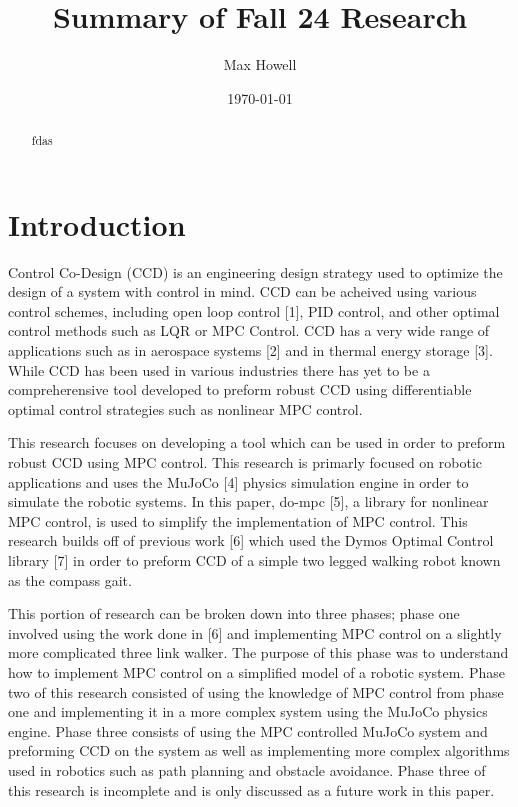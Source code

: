 \documentclass{./springer/svjour3}
\title{Summary of Fall 24 Research}
\author{Max Howell}
\institute{University Of Tennessee Knoxville$^*$ ($^*$corresponding author),
          \email{mhowel30@vols.utk.edu} \\
        \\
          \at MABE, University of Tennessee, Knoxville,
          \at Nathan W. Dougherty Engineering Building, 1512 Middle Dr, Knoxville, TN 37916\\
}
\date{\today}
\begin{document}
\maketitle{}

\begin{abstract}

fdas

\end{abstract}

\section{Introduction}

Control Co-Design (CCD) is an engineering design strategy used to optimize the design of a system with control in mind. CCD can be acheived using various control schemes, 
including open loop control [1], PID control, and other optimal control methods such as LQR or MPC Control. CCD has a very wide range of applications such as in 
aerospace systems [2] and in thermal energy storage [3]. While CCD has been used in various industries there has yet to be a compreherensive tool developed
to preform robust CCD using differentiable optimal control strategies such as nonlinear MPC control.

This research focuses on developing a tool which can be used in order to preform robust CCD using MPC control. This research is primarly focused on robotic applications and uses 
the MuJoCo [4] physics simulation engine in order to simulate the robotic systems. In this paper, do-mpc [5], a library for nonlinear MPC control, is used to simplify the 
implementation of MPC control. This research builds off of previous work [6] which used the Dymos Optimal Control library [7] in order to preform CCD of a simple 
two legged walking robot known as the compass gait. 

This portion of research can be broken down into three phases; phase one involved using the work done in [6] and implementing MPC control on a slightly 
more complicated three link walker. The purpose of this phase was to understand how to implement MPC control on a simplified model of a robotic system.
Phase two of this research consisted of using the knowledge of MPC control from phase one and implementing it in a more complex system using the MuJoCo physics engine.
Phase three consists of using the MPC controlled MuJoCo system and preforming CCD on the system as well as implementing more complex algorithms used in robotics such as 
path planning and obstacle avoidance. Phase three of this research is incomplete and is only discussed as a future work in this paper.
\end{document}
